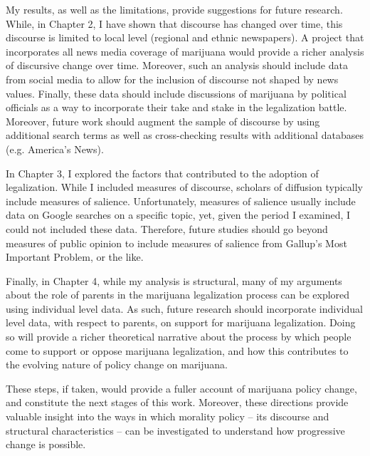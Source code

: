 My results, as well as the limitations, provide suggestions for future research. While, in Chapter 2, I have shown that discourse has changed over time, this discourse is limited to local level (regional and ethnic newspapers). A project that incorporates all news media coverage of marijuana would provide a richer analysis of discursive change over time. Moreover, such an analysis should include data from social media to allow for the inclusion of discourse not shaped by news values. Finally, these data should include discussions of marijuana by political officials as a way to incorporate their take and stake in the legalization battle. Moreover, future work should augment the sample of discourse by using additional search terms as well as cross-checking results with additional databases (e.g. America's News). 

In Chapter 3, I explored the factors that contributed to the adoption of legalization. While I included measures of discourse, scholars of diffusion typically include measures of salience. Unfortunately, measures of salience usually include data on Google searches on a specific topic, yet, given the period I examined, I could not included these data. Therefore, future studies should go beyond measures of public opinion to include measures of salience from Gallup's Most Important Problem, or the like. 

Finally, in Chapter 4, while my analysis is structural, many of my arguments about the role of parents in the marijuana legalization process can be explored using individual level data. As such, future research should incorporate individual level data, with respect to parents, on support for marijuana legalization. Doing so will provide a richer theoretical narrative about the process by which people come to support or oppose marijuana legalization, and how this contributes to the evolving nature of policy change on marijuana. 


These steps, if taken, would provide a fuller account of marijuana policy change, and constitute the next stages of this work. Moreover, these directions provide valuable insight into the ways in which morality policy -- its discourse and structural characteristics -- can be investigated to understand how progressive change is possible. 


